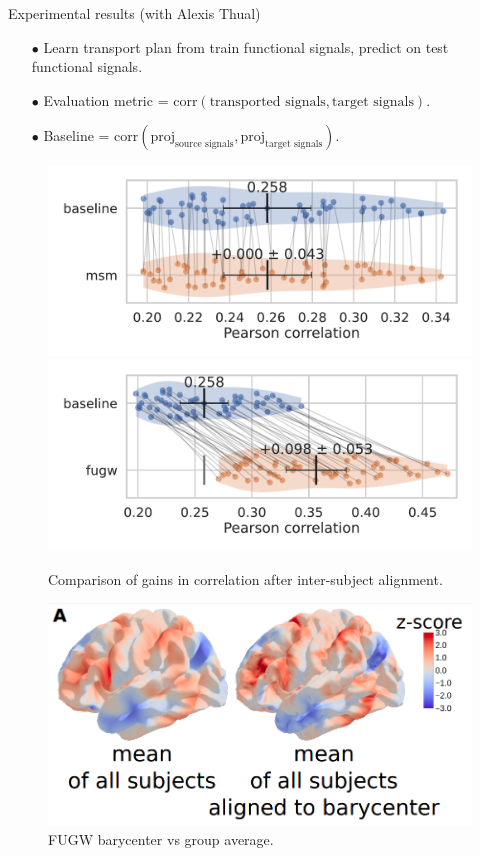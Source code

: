 \documentclass{beamer}
\begin{document}
\begin{frame}{Experimental results (with Alexis Thual)}
\scriptsize
\begin{itemize}
  \item[$\bullet$] Learn transport plan from train functional signals, predict on test functional signals.
  \item[$\bullet$] Evaluation metric = $\text{corr}(\text{transported signals}, \text{target signals})$.
  \item[$\bullet$] Baseline = $\text{corr}(\text{proj}_{\text{source signals}}, \text{proj}_{\text{target signals}})$.
\end{itemize}
\begin{figure}
  \centering
  \includegraphics[width=0.49\linewidth, keepaspectratio=true]{OT_new/fsaverage5_alignment_correlation_gain_msm.pdf}
  \includegraphics[width=0.49\linewidth, keepaspectratio=true]{OT_new/fsaverage5_alignment_correlation_gain_fugw.pdf}
  \caption*{\scriptsize{Comparison of gains in correlation after inter-subject alignment.}}
\end{figure}

\vspace{-0.2cm}
\begin{figure}
  \centering
  \includegraphics[width=0.4\linewidth, keepaspectratio=true]{OT_new/brain_template.png}
  \caption*{\scriptsize{FUGW barycenter vs group average.}}
\end{figure}


\end{frame}
\end{document}

